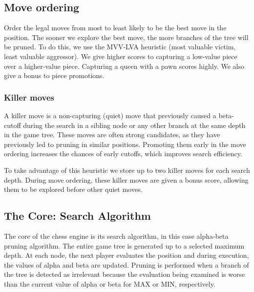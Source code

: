 \subsection{Move ordering}

Order the legal moves from most to least likely to be the best move in the position. The sooner we explore the best move, the more branches of the tree will be pruned. To do this, we use the MVV-LVA heuristic (most valuable victim, least valuable aggressor). We give higher scores to capturing a low-value piece over a higher-value piece. Capturing a queen with a pawn scores highly. We also give a bonus to piece promotions.

\vspace{1em}

\subsubsection{Killer moves}

A killer move is a non-capturing (quiet) move that previously caused a beta-cutoff during the search in a sibling node or any other branch at the same depth in the game tree. These moves are often strong candidates, as they have previously led to pruning in similar positions. Promoting them early in the move ordering increases the chances of early cutoffs, which improves search efficiency.

\vspace{1em}

\noindent To take advantage of this heuristic we store up to two killer moves for each search depth. During move ordering, these killer moves are given a bonus score, allowing them to be explored before other quiet moves.

\vspace{1em}

\subsection{The Core: Search Algorithm}

The core of the chess engine is its search algorithm, in this case alpha-beta pruning algorithm. The entire game tree is generated up to a selected maximum depth. At each node, the next player evaluates the position and during execution, the values of alpha and beta are updated. Pruning is performed when a branch of the tree is detected as irrelevant because the evaluation being examined is worse than the current value of alpha or beta for MAX or MIN, respectively.

